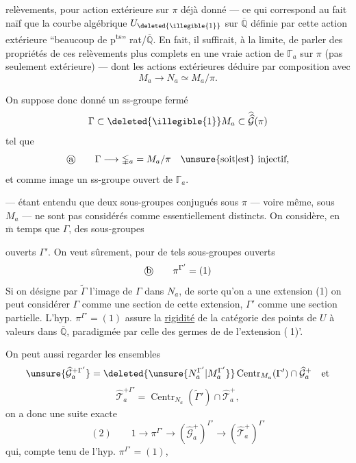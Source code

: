 
 relèvements, pour  action extérieure sur $\pi$ déjà donné --- ce qui correspond au fait naïf que la courbe algébrique $U_{\deleted{\illegible{1}}}$ sur $\overline{\mathbb Q}$ définie par cette action extérieure  ``beaucoup de p\textsuperscript{ts}'' rat/$\overline{\mathbb Q}$. En fait, il suffirait, à la limite, de parler des  propriétés de ces relèvements plus complets en une vraie action de  $\mathbb{\Gamma}_a$ sur $\pi$ (pas seulement extérieure) --- dont les actions extérieures   déduire par composition avec
\[
M_a \longrightarrow N_a \simeq M_a/\pi.
\]

 On suppose donc donné un ss-groupe fermé
\[
\Gamma \subset \deleted{\illegible{1}} M_a \subset \widehat{\widehat{\mathcal G}}(\pi)
\]
tel que
\[
\text{\textcircled{a}}\qquad
\Gamma \longrightarrow \mathbb{\Gamma}_a
 = M_a/\pi
\quad \text{\unsure{soit|est} injectif,}
\]
et  comme image un ss-groupe ouvert de $\mathbb{\Gamma}_a$.

--- étant entendu que deux sous-groupes conjugués sous $\pi$ --- voire même,  sous $M_a$ --- ne sont pas considérés comme essentiellement distincts. On considère, en $\overline{\mathrm m}$ temps que $\Gamma$, des sous-groupes


ouverts $\Gamma'$. On veut sûrement, pour de tels sous-groupes ouverts
\[
\text{\textcircled{b}}\qquad \pi^{\Gamma'}=(1)
\]
Si on désigne par $\widetilde{\Gamma}$ l'image de $\Gamma$ dans $N_a$, de sorte qu'on a une extension
(1)\quad
{}
on peut considérer $\Gamma$ comme une section de cette extension, $\Gamma'$ comme une section partielle. L'hyp. $\pi^{\Gamma'}=(1)$ assure la \uline{rigidité} de la catégorie des points de $U$ à valeurs dans $\overline{\mathbb Q}$, paradigmée par celle des germes de  de l'extension \textcircled{(1)'}.

On peut aussi regarder les ensembles
\[
\unsure{\widehat{\mathcal G}_a^{+\Gamma'}}
=
\deleted{\unsure{N_a^{\Gamma'}|M_a^{\Gamma'}}}
\operatorname{Centr}_{M_a}(\Gamma')\cap\widehat{\mathcal G}_a^+
\quad\text{et}
\]
\[
\widehat{\mathcal T}_a^{+\Gamma'}
=\operatorname{Centr}_{N_a}(\widetilde{\Gamma}')\cap\widehat{\mathcal T}_a^+,
\]
 on a donc une suite exacte
\[
(2)\qquad 1\longrightarrow\pi^{\Gamma'}\longrightarrow
(\widehat{\mathcal G}_a^+)^{\Gamma'}\longrightarrow
(\widehat{\mathcal T}_a^+)^{\Gamma'}
\]
qui, compte tenu de l'hyp. $\pi^{\Gamma'}=(1)$,

